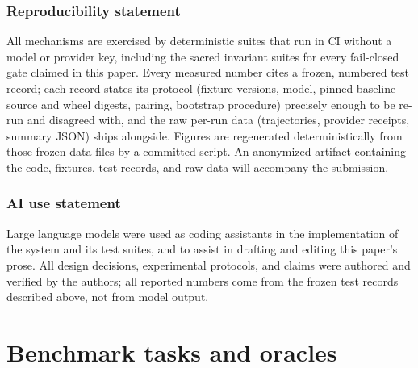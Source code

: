 \documentclass{article} %
\begin{document}
\subsubsection*{Reproducibility statement}

All mechanisms are exercised by deterministic suites that run in CI without a model or
provider key, including the sacred invariant suites for every fail-closed gate claimed
in this paper. Every measured number cites a frozen, numbered test record; each record
states its protocol (fixture versions, model, pinned baseline source and wheel digests,
pairing, bootstrap procedure) precisely enough to be re-run and disagreed with, and the
raw per-run data (trajectories, provider receipts, summary JSON) ships alongside.
Figures are regenerated deterministically from those frozen data files by a committed
script. An anonymized artifact containing the code, fixtures, test records, and raw
data will accompany the submission.

\subsubsection*{AI use statement}

Large language models were used as coding assistants in the implementation of the
system and its test suites, and to assist in drafting and editing this paper's prose.
All design decisions, experimental protocols, and claims were authored and verified by
the authors; all reported numbers come from the frozen test records described above,
not from model output.




\appendix

\section{Benchmark tasks and oracles}
\label{app:benchmark}
\end{document}
